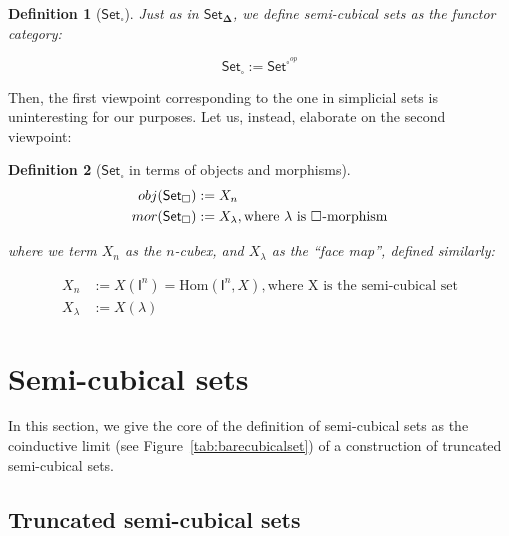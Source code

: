\documentclass[10pt, titlepage]{amsart}
\newtheorem{definition}{Definition}
\newcommand{\SSet}{\ensuremath{\mathsf{Set}_{\boldsymbol{\Delta}}}}
\newcommand{\Set}{\ensuremath{\mathsf{Set}}}
\newcommand{\Cube}[1]{\ensuremath{\boldsymbol{\square^{#1}}}}
\newcommand{\I}[1]{\ensuremath{\mathsf{I}^{#1}}}
\newcommand{\CSet}{\ensuremath{\mathsf{Set}_{\boldsymbol{\square}}}}
\begin{document}
\begin{definition}[\CSet]
  Just as in \SSet, we define semi-cubical sets as the functor category:

  \begin{equation*}
    \CSet := \Set^{\Cube{}^{op}}
  \end{equation*}
\end{definition}

Then, the first viewpoint corresponding to the one in simplicial sets is uninteresting for our purposes. Let us, instead, elaborate on the second viewpoint:

\begin{definition}[$\CSet$ in terms of objects and morphisms]
  \begin{align*}
    obj(\CSet) & := X_n                                                   \\
    mor(\CSet) & := X_\lambda, \text{where $\lambda$ is \Cube{}-morphism}
  \end{align*}

  where we term $X_n$ as the $n$-cubex, and $X_\lambda$ as the ``face map'', defined similarly:

  \begin{align*}
    X_n       & := X(\I{n}) = \text{Hom}(\I{n}, X), \text{where X is the semi-cubical set} \\
    X_\lambda & := X(\lambda)
  \end{align*}
\end{definition}

\section{Semi-cubical sets}

In this section, we give the core of the definition of semi-cubical
sets as the coinductive limit (see Figure~\ref{tab:barecubicalset}) of a
construction of truncated semi-cubical sets.

\subsection{Truncated semi-cubical sets}
\end{document}
